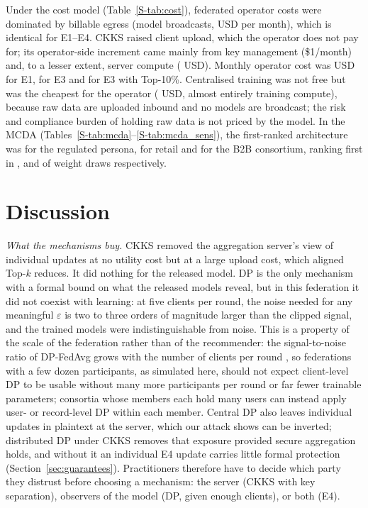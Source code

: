 \documentclass[11pt,a4paper]{article}
\begin{document}
Under the cost model (Table~\ref{S-tab:cost}), federated operator costs were dominated by billable egress (model broadcasts,  USD per month), which is identical for E1--E4. CKKS raised client upload, which the operator does not pay for; its operator-side increment came mainly from key management (\$1/month) and, to a lesser extent, server compute ( USD). Monthly operator cost was  USD for E1,  for E3 and  for E3 with Top-10\%. Centralised training was not free but was the cheapest for the operator ( USD, almost entirely training compute), because raw data are uploaded inbound and no models are broadcast; the risk and compliance burden of holding raw data is not priced by the model. In the MCDA (Tables~\ref{S-tab:mcda}--\ref{S-tab:mcda_sens}), the first-ranked architecture was  for the regulated persona,  for retail and  for the B2B consortium, ranking first in ,  and  of weight draws respectively.

\section{Discussion}

\textit{What the mechanisms buy.} CKKS removed the aggregation server's view of individual updates at no utility cost but at a large upload cost, which aligned Top-$k$ reduces. It did nothing for the released model. DP is the only mechanism with a formal bound on what the released models reveal, but in this federation it did not coexist with learning: at five clients per round, the noise needed for any meaningful $\varepsilon$ is two to three orders of magnitude larger than the clipped signal, and the trained models were indistinguishable from noise. This is a property of the scale of the federation rather than of the recommender: the signal-to-noise ratio of DP-FedAvg grows with the number of clients per round \cite{mcmahan2018learning}, so federations with a few dozen participants, as simulated here, should not expect client-level DP to be usable without many more participants per round or far fewer trainable parameters; consortia whose members each hold many users can instead apply user- or record-level DP within each member. Central DP also leaves individual updates in plaintext at the server, which our attack shows can be inverted; distributed DP under CKKS removes that exposure provided secure aggregation holds, and without it an individual E4 update carries little formal protection (Section~\ref{sec:guarantees}). Practitioners therefore have to decide which party they distrust before choosing a mechanism: the server (CKKS with key separation), observers of the model (DP, given enough clients), or both (E4).
\end{document}
